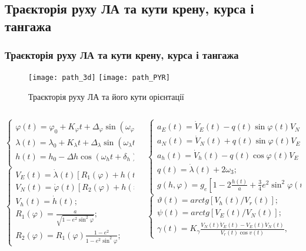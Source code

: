\documentclass[ucs,compress]{beamer}    %
\begin{document}
\subsection{Траєкторія руху ЛА та кути крену, курса і тангажа} 
\begin{frame}[plain,shrink=10]
\frametitle{Траєкторія руху ЛА та кути крену, курса і тангажа}
\noindent
\begin{figure}[l]
\noindent\texttt{[image: path\_3d]}
\texttt{[image: path\_PYR]}
\caption{\tiny Траєкторія руху ЛА та його кути орієнтації }
\end{figure}\tiny
\begin{columns}[t]
\begin{column}{4cm}\noindent
$\left \{ \begin{array}{l} 
{\varphi (t)=\varphi_{0}+K_{\varphi } t+\Delta_{\varphi } \sin (\omega_{\varphi } t+\delta_{\varphi } );} \\ 
{\lambda (t)=\lambda_{0}+K_{\lambda } t+\Delta_{\lambda } \sin (\omega_{\lambda } t+\delta_{_{\lambda } } );} \\ 
{h(t)=h_{0} -\Delta h \cos (\omega_{h} t+\delta_{h} );} \\ 
\end{array}\right.$
$\left \{\begin{array}{l}
{V_{E} (t)=\dot{\lambda }(t)\left[R_{1} (\varphi )+h(t)\right]\cos \varphi (t);} \\ 
{V_{N} (t)=\dot{\varphi }(t)[R_{2} (\varphi )+h(t)];} \\ 
{V_{h} (t)=\dot{h}(t);} \\ {R_{1} (\varphi )=\frac{a}{\sqrt{1-e^{2} \sin ^{2} \varphi } } ;} \\ 
{R_{2} (\varphi )=R_{1} (\varphi )\frac{1-e^{2} }{1-e^{2} \sin ^{2} \varphi } ;} 
\end{array} \right.$
\end{column}
\begin{column}{6cm}\noindent
$\left \{\begin{array}{l} 
{a_{E}(t)=\dot{V}_{E} (t)-q(t)\sin \varphi (t)V_{N} (t)+q(t)\cos (t)V_{h} (t);} \\ 
{a_{N}(t)=\dot{V}_{N} (t)+q(t)\sin \varphi (t)V_{E} (t)+\dot{\varphi }(t)V_{h} (t);} \\ 
{a_{h}(t)=\dot{V}_{h} (t)-q(t)\cos \varphi (t)V_{E} (t)-\dot{\varphi }(t)V_{N} (t)+g(h,\varphi);} \\ 
{q(t)=\dot{\lambda }(t)+2\omega_{3} ;} \\ 
{g(h,\varphi)=g_{e} [1-2\frac{h(t)}{a} +\frac{3}{4} e^{2} \sin ^{2} \varphi (t)];} 
\end{array}\right.$
$\left \{\begin{array}{l} 
{\vartheta(t)=arctg[V_{h} (t)/V_{r} (t)];} \\ 
{\psi (t)=arctg[V_{E}(t)/V_{N} (t)];} \\ 
{\gamma (t)=K_{\gamma }\frac{V_{N}(t)\dot{V}_{E}(t)-V_{E}(t)\dot{V}_{N}(t)}{V_{r}(t)\cos v(t)},}
 \end{array}\right.$
\end{column}
\end{columns}
\end{frame}
\end{document}
